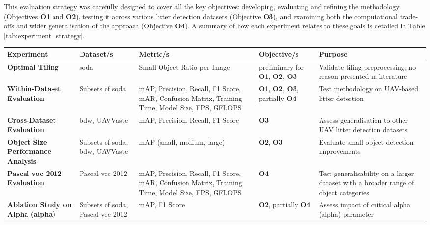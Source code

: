 This evaluation strategy was carefully designed to cover all the key objectives: developing, evaluating and refining the methodology (Objectives \textbf{O1} and \textbf{O2}), testing it across various litter detection datasets (Objective \textbf{O3}), and examining both the computational trade-offs and wider generalisation of the approach (Objective \textbf{O4}). A summary of how each experiment relates to these goals is detailed in Table \ref{tab:experiment_strategy}.


\renewcommand{\arraystretch}{1.5} %
\begin{table}[htbp]
    \centering
    \small
    \begin{adjustbox}{max width=\textwidth}
    \begin{tabular}{|l|p{3.5cm}|p{3.5cm}|p{2.5cm}|p{5cm}|}
        \hline
        \textbf{Experiment} & \textbf{Dataset/s} & \textbf{Metric/s} & \textbf{Objective/s} & \textbf{Purpose} \\
        \hline \hline
        \textbf{Optimal Tiling} & \gls{soda} & Small Object Ratio per Image & preliminary for \textbf{O1}, \textbf{O2}, \textbf{O3} & Validate tiling preprocessing; no reason presented in literature \\ \hline
        \textbf{Within-Dataset Evaluation} & Subsets of \gls{soda} & mAP, Precision, Recall, F1 Score, mAR, Confusion Matrix, Training Time, Model Size, FPS, GFLOPS & \textbf{O1}, \textbf{O2}, \textbf{O3}, partially \textbf{O4} & Test methodology on UAV-based litter detection \\ \hline
        \textbf{Cross-Dataset Evaluation} & \gls{bdw}, UAVVaste & mAP, Precision, Recall, F1 Score & \textbf{O3} & Assess generalisation to other UAV litter detection datasets \\ \hline
        \textbf{Object Size  Performance Analysis} & Subsets of \gls{soda}, \gls{bdw}, UAVVaste & mAP (small, medium, large) & \textbf{O2}, \textbf{O3} & Evaluate small-object detection improvements \\ \hline
        \textbf{Pascal \gls{voc} 2012 Evaluation} & Pascal \gls{voc} 2012 & mAP, Precision, Recall, F1 Score, mAR, Confusion Matrix, Training Time, Model Size, FPS, GFLOPS & \textbf{O4} & Test generalisability on a larger dataset with a broader range of object categories \\ \hline
        \textbf{Ablation Study on Alpha (\gls{alpha})} & Subsets of \gls{soda}, Pascal \gls{voc} 2012 & mAP, F1 Score & \textbf{O2}, partially \textbf{O4} & Assess impact of critical  alpha (\gls{alpha}) parameter \\ \hline

\end{tabular}
\end{adjustbox}
\end{table}
